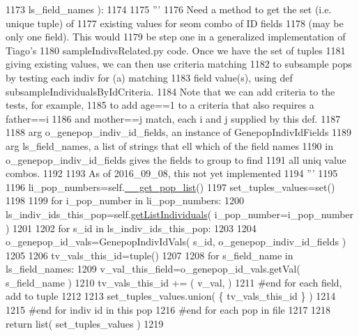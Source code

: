 \begin{DoxyCode}
1173                             ls\_field\_names ):
1174 
1175         \textcolor{stringliteral}{'''}
1176 \textcolor{stringliteral}{        Need a method to get the set (i.e. unique tuple) of }
1177 \textcolor{stringliteral}{        existing values for seom combo of ID fields }
1178 \textcolor{stringliteral}{        (may be only one field).  This would }
1179 \textcolor{stringliteral}{        be step one in a generalized implementation of Tiago's }
1180 \textcolor{stringliteral}{        sampleIndivsRelated.py code. Once we have the set of tuples }
1181 \textcolor{stringliteral}{        giving existing values, we can then use criteria matching }
1182 \textcolor{stringliteral}{        to subsample pops by testing each indiv for (a) matching }
1183 \textcolor{stringliteral}{        field value(s), using def subsampleIndividualsByIdCriteria.  }
1184 \textcolor{stringliteral}{        Note that we can add criteria to the tests, for example, }
1185 \textcolor{stringliteral}{        to add age==1 to a criteria that also requires a father==i }
1186 \textcolor{stringliteral}{        and mother==j match, each i and j supplied by this def.}
1187 \textcolor{stringliteral}{}
1188 \textcolor{stringliteral}{        arg o\_genepop\_indiv\_id\_fields, an instance of GenepopIndivIdFields}
1189 \textcolor{stringliteral}{        arg ls\_field\_names, a list of strings that ell which of the field names}
1190 \textcolor{stringliteral}{                in o\_genepop\_indiv\_id\_fields gives the fields to group to find}
1191 \textcolor{stringliteral}{                all uniq value combos.}
1192 \textcolor{stringliteral}{}
1193 \textcolor{stringliteral}{        As of 2016\_09\_08, this not yet implemented}
1194 \textcolor{stringliteral}{        '''}
1195 
1196         li\_pop\_numbers=self.\hyperlink{classnegui_1_1genepopfilemanager_1_1GenepopFileManager_a0cd3178624c652968b4d319f12e5df6e}{\_\_get\_pop\_list}() 
1197         set\_tuples\_values=set()
1198 
1199         \textcolor{keywordflow}{for} i\_pop\_number \textcolor{keywordflow}{in} li\_pop\_numbers:
1200             ls\_indiv\_ids\_this\_pop=self.\hyperlink{classnegui_1_1genepopfilemanager_1_1GenepopFileManager_aa6993dde24163002aeae55005437711d}{getListIndividuals}( i\_pop\_number=i\_pop\_number )
1201 
1202             \textcolor{keywordflow}{for} s\_id \textcolor{keywordflow}{in} ls\_indiv\_ids\_this\_pop:
1203 
1204                 o\_genepop\_id\_vals=GenepopIndivIdVals( s\_id, o\_genepop\_indiv\_id\_fields )
1205 
1206                 tv\_vals\_this\_id=tuple() 
1207 
1208                 \textcolor{keywordflow}{for} s\_field\_name \textcolor{keywordflow}{in} ls\_field\_names:
1209                     v\_val\_this\_field=o\_genepop\_id\_vals.getVal( s\_field\_name )
1210                     tv\_vals\_this\_id += ( v\_val, )
1211                 \textcolor{comment}{#end for each field, add to tuple}
1212 
1213                 set\_tuples\_values.union( \{ tv\_vals\_this\_id \} )
1214 
1215             \textcolor{comment}{#end for indiv id in this pop}
1216         \textcolor{comment}{#end for each pop in file}
1217 
1218         \textcolor{keywordflow}{return} list( set\_tuples\_values )
1219 
\end{DoxyCode}
